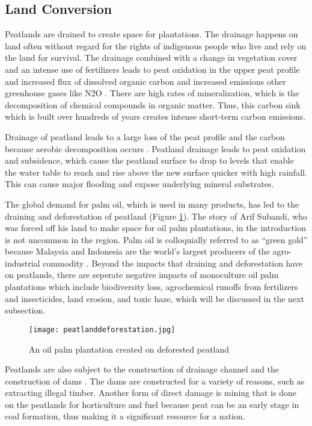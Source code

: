 \subsection{Land Conversion}

Peatlands are drained to create space for plantations. The drainage happens on land often without regard for the rights of indigenous people who live and rely on the land for survival. The drainage combined with a change in vegetation cover and an intense use of fertilizers leads to peat oxidation in the upper peat profile and increased flux of dissolved organic carbon and increased emissions other greenhouse gases like N2O \citep{larmola2013vegetation}. There are high rates of mineralization, which is the decomposition of chemical compounds in organic matter. Thus, this carbon sink which is built over hundreds of years creates intense short-term carbon emissions. 

Drainage of peatland leads to a large loss of the peat profile and the carbon because aerobic decomposition occurs \citep{page2009restoration}. Peatland drainage leads to peat oxidation and subsidence, which cause the peatland surface to drop to levels that enable the water table to reach and rise above the new surface quicker with high rainfall. This can cause major flooding and expose underlying mineral substrates. 

The global demand for palm oil, which is used in many products, has led to the draining and deforestation of peatland (Figure \ref{fig:peatlanddeforestation}). The story of Arif Subandi, who was forced off his land to make space for oil palm plantations, in the introduction is not uncommon in the region. Palm oil is colloquially referred to as ``green gold'' because Malaysia and Indonesia are the world's largest producers of the agro-industrial commodity \citep{othman2003linking}. Beyond the impacts that draining and deforestation have on peatlands, there are seperate negative impacts of monoculture oil palm plantations which include biodiversity loss, agrochemical runoffs from fertilizers and insecticides, land erosion, and toxic haze, which will be discussed in the next subsection.  

\begin{figure}[ht]
  \texttt{[image: peatlanddeforestation.jpg]}
  \caption{An oil palm plantation created on deforested peatland}
  \label{fig:peatlanddeforestation}
\end{figure}

Peatlands are also subject to the construction of drainage channel and the construction of dams \citep{suyanto2004role}. The dams are constructed for a variety of reasons, such as extracting illegal timber. Another form of direct damage is mining that is done on the peatlands for horticulture and fuel because peat can be an early stage in coal formation, thus making it a significant resource for a nation. 

